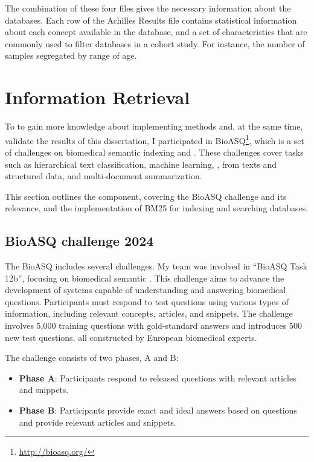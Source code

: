 \hspace{1cm}

The combination of these four files gives the necessary information about the databases. Each row of the Achilles Results file contains statistical information about each concept available in the database, and a set of characteristics that are commonly used to filter databases in a cohort study. For instance, the number of samples segregated by range of age. 


\section{Information Retrieval}

To to gain more knowledge about implementing {\ir} methods and, at the same time, validate the {\ir} results of this dissertation, I participated in BioASQ\footnote{\url{http://bioasq.org/}}, which is a set of challenges on biomedical semantic indexing and {\qa}. These challenges cover tasks such as hierarchical text classification, machine learning, {\ir}, {\qa} from texts and structured data, and multi-document summarization.

This section outlines the {\ir} component, covering the BioASQ challenge and its relevance, and the implementation of BM25 for indexing and searching databases.


\subsection{BioASQ challenge 2024}
\label{bioasq}

The BioASQ includes several challenges. My team was involved in ``BioASQ Task 12b'', focusing on biomedical semantic {\qa}. This challenge aims to advance the development of systems capable of understanding and answering biomedical questions. Participants must respond to test questions using various types of information, including relevant concepts, articles, and snippets. The challenge involves 5,000 training questions with gold-standard answers and introduces 500 new test questions, all constructed by European biomedical experts. 

The challenge consists of two phases, A and B:

\begin{itemize}
    \item \textbf{Phase A}: Participants respond to released questions with relevant articles and snippets.
    \item \textbf{Phase B}: Participants provide exact and ideal answers based on questions and provide relevant articles and snippets.
\end{itemize}

